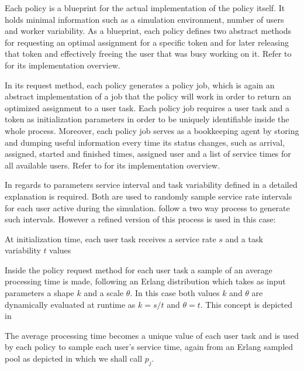 Each policy is a blueprint for the actual implementation of the policy itself. It holds minimal information such as a simulation environment, number of users and worker variability. As a blueprint, each policy defines two abstract methods for requesting an optimal assignment for a specific token and for later releasing that token and effectively freeing the user that was busy working on it. Refer to  for its implementation overview.


In its request method, each policy generates a policy job, which is again an abstract implementation of a job that the policy will work in order to return an optimized assignment to a user task. Each policy job requires a user task and a token as initialization parameters in order to be uniquely identifiable inside the whole process. Moreover, each policy job serves as a bookkeeping agent by storing and dumping useful information every time its status changes, such as arrival, assigned, started and finished times, assigned user and a list of service times for all available users. Refer to  for its implementation overview.


In regards to parameters service interval and task variability defined in  a detailed explanation is required. Both are used to randomly sample service rate intervals for each user active during the simulation. \citet[p. 8]{Zeng2005} follow a two way process to generate such intervals. However a refined version of this process is used in this case:
\begin{enumerate*}
	\item At initialization time, each user task receives a service rate $s$ and a task variability $t$ values
	\item Inside the policy request method for each user task a sample of an average processing time is made, following an Erlang distribution which takes as input parameters a shape $k$ and a scale $\theta$. In this case both values $k$ and $\theta$ are dynamically evaluated at runtime as $k=s/t$ and $\theta = t$. This concept is depicted in 
	\item The average processing time becomes a unique value of each user task and is used by each policy to sample each user's service time, again from an Erlang sampled pool as depicted in  which we shall call $p_j$.
\end{enumerate*}

